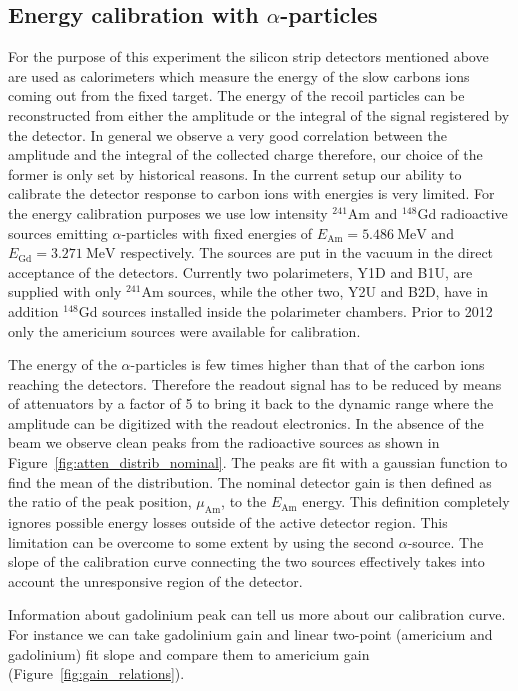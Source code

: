 \documentclass[a4paper,12pt]{article}
\newcommand\americium{${}^{241}$Am}
\newcommand\gadolinium{${}^{148}$Gd}
\begin{document}
\subsection{Energy calibration with $\alpha$-particles}

For the purpose of this experiment the silicon strip detectors mentioned above
are used as calorimeters which measure the energy of the slow carbons ions
coming out from the fixed target. The energy of the recoil particles can be
reconstructed from either the amplitude or the integral of the signal registered
by the detector. In general we observe a very good correlation between the
amplitude and the integral of the collected charge therefore, our choice of the
former is only set by historical reasons. In the current setup our ability to
calibrate the detector response to carbon ions with energies is very limited.
For the energy calibration purposes we use low intensity \americium{} and
\gadolinium{} radioactive sources emitting $\alpha$-particles with fixed
energies of $E_{\text{Am}} = 5.486~\text{MeV}$ and $E_{\text{Gd}} =
3.271~\text{MeV}$ respectively. The sources are put in the vacuum in the direct
acceptance of the detectors. Currently two polarimeters, Y1D and B1U, are
supplied with only \americium{} sources, while the other two, Y2U and B2D, have
in addition \gadolinium{} sources installed inside the polarimeter chambers.
Prior to 2012 only the americium sources were available for calibration.

The energy of the $\alpha$-particles is few times higher than that of the carbon
ions reaching the detectors. Therefore the readout signal has to be reduced by
means of attenuators by a factor of 5 to bring it back to the dynamic range
where the amplitude can be digitized with the readout electronics. In the
absence of the beam we observe clean peaks from the radioactive sources as shown
in Figure~\ref{fig:atten_distrib_nominal}. The peaks are fit with a gaussian
function to find the mean of the distribution. The nominal detector gain is then
defined as the ratio of the peak position, $\mu_{\text{Am}}$, to the
$E_{\text{Am}}$ energy. This definition completely ignores possible energy
losses outside of the active detector region. This limitation can be overcome to
some extent by using the second $\alpha$-source. The slope of the calibration
curve connecting the two sources effectively takes into account the unresponsive
region of the detector.

Information about gadolinium peak can tell us more about our calibration curve.
For instance we can take gadolinium gain and linear two-point (americium and
gadolinium) fit slope and compare them to americium gain
(Figure~\ref{fig:gain_relations}).
\end{document}
